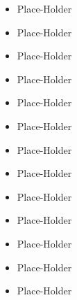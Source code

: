 







\begin{itemize}
    \item Place-Holder
    \item Place-Holder
\end{itemize}
\smallskip
{}
\begin{itemize}
    \item Place-Holder
    \item Place-Holder
    \item Place-Holder
\end{itemize}
\smallskip
{}
\begin{itemize}
    \item Place-Holder
    \item Place-Holder
    \item Place-Holder
    \item Place-Holder
\end{itemize}
\smallskip
{}
\begin{itemize}
    \item Place-Holder
    \item Place-Holder
\end{itemize}
\smallskip
{}
\begin{itemize}
    \item Place-Holder
    \item Place-Holder
\end{itemize}

